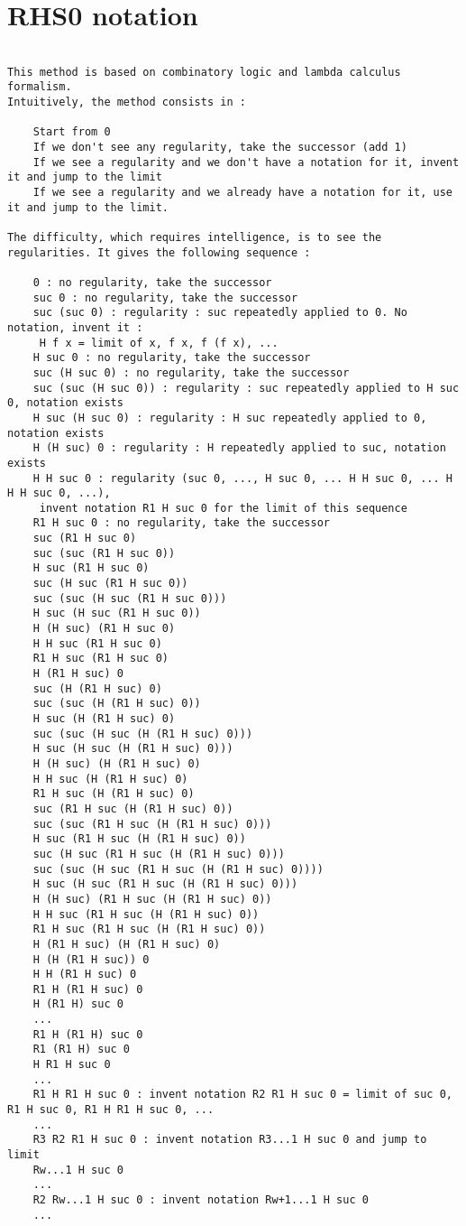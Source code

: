 \documentclass[10pt]{article}
\begin{document}
\section{RHS0 notation}

\begin{verbatim}

This method is based on combinatory logic and lambda calculus formalism.
Intuitively, the method consists in :

    Start from 0
    If we don't see any regularity, take the successor (add 1)
    If we see a regularity and we don't have a notation for it, invent it and jump to the limit
    If we see a regularity and we already have a notation for it, use it and jump to the limit. 

The difficulty, which requires intelligence, is to see the regularities. It gives the following sequence :

    0 : no regularity, take the successor
    suc 0 : no regularity, take the successor
    suc (suc 0) : regularity : suc repeatedly applied to 0. No notation, invent it : 
     H f x = limit of x, f x, f (f x), ...
    H suc 0 : no regularity, take the successor
    suc (H suc 0) : no regularity, take the successor
    suc (suc (H suc 0)) : regularity : suc repeatedly applied to H suc 0, notation exists
    H suc (H suc 0) : regularity : H suc repeatedly applied to 0, notation exists
    H (H suc) 0 : regularity : H repeatedly applied to suc, notation exists
    H H suc 0 : regularity (suc 0, ..., H suc 0, ... H H suc 0, ... H H H suc 0, ...), 
     invent notation R1 H suc 0 for the limit of this sequence
    R1 H suc 0 : no regularity, take the successor
    suc (R1 H suc 0)
    suc (suc (R1 H suc 0))
    H suc (R1 H suc 0)
    suc (H suc (R1 H suc 0))
    suc (suc (H suc (R1 H suc 0)))
    H suc (H suc (R1 H suc 0))
    H (H suc) (R1 H suc 0)
    H H suc (R1 H suc 0)
    R1 H suc (R1 H suc 0)
    H (R1 H suc) 0
    suc (H (R1 H suc) 0)
    suc (suc (H (R1 H suc) 0))
    H suc (H (R1 H suc) 0)
    suc (suc (H suc (H (R1 H suc) 0)))
    H suc (H suc (H (R1 H suc) 0)))
    H (H suc) (H (R1 H suc) 0)
    H H suc (H (R1 H suc) 0)
    R1 H suc (H (R1 H suc) 0)
    suc (R1 H suc (H (R1 H suc) 0))
    suc (suc (R1 H suc (H (R1 H suc) 0)))
    H suc (R1 H suc (H (R1 H suc) 0))
    suc (H suc (R1 H suc (H (R1 H suc) 0)))
    suc (suc (H suc (R1 H suc (H (R1 H suc) 0))))
    H suc (H suc (R1 H suc (H (R1 H suc) 0)))
    H (H suc) (R1 H suc (H (R1 H suc) 0))
    H H suc (R1 H suc (H (R1 H suc) 0))
    R1 H suc (R1 H suc (H (R1 H suc) 0))
    H (R1 H suc) (H (R1 H suc) 0)
    H (H (R1 H suc)) 0
    H H (R1 H suc) 0
    R1 H (R1 H suc) 0
    H (R1 H) suc 0
    ...
    R1 H (R1 H) suc 0
    R1 (R1 H) suc 0
    H R1 H suc 0
    ...
    R1 H R1 H suc 0 : invent notation R2 R1 H suc 0 = limit of suc 0, R1 H suc 0, R1 H R1 H suc 0, ...
    ...
    R3 R2 R1 H suc 0 : invent notation R3...1 H suc 0 and jump to limit
    Rw...1 H suc 0
    ...
    R2 Rw...1 H suc 0 : invent notation Rw+1...1 H suc 0
    ... 



\end{verbatim}
\end{document}
